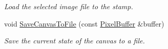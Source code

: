 \begin{DoxyCompactItemize}
\begin{DoxyCompactList}\small\item\em Load the selected image file to the stamp. \end{DoxyCompactList}\item 
void \hyperlink{classimage__tools_1_1IOManager_acf47f54c83d9df771342b2fb6891dad2}{Save\+Canvas\+To\+File} (const \hyperlink{classimage__tools_1_1PixelBuffer}{Pixel\+Buffer} \&buffer)\hypertarget{classimage__tools_1_1IOManager_acf47f54c83d9df771342b2fb6891dad2}{}\label{classimage__tools_1_1IOManager_acf47f54c83d9df771342b2fb6891dad2}

\begin{DoxyCompactList}\small\item\em Save the current state of the canvas to a file. \end{DoxyCompactList}\end{DoxyCompactItemize}

